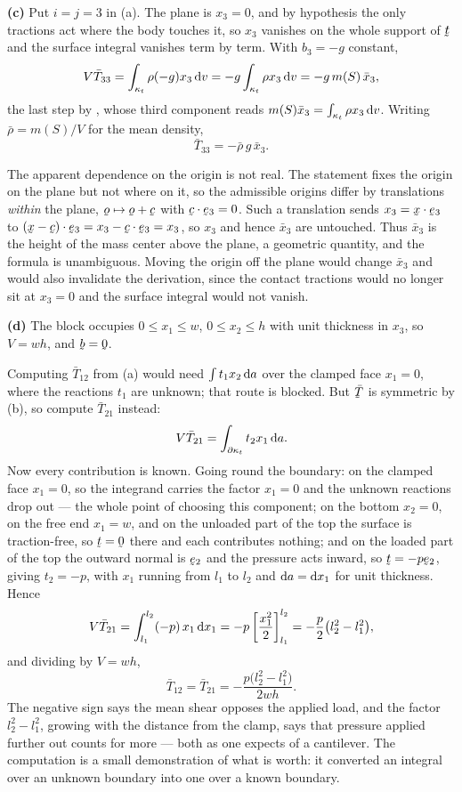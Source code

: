 \begin{solution}
\medskip
\noindent\textbf{(c)}
Put $i=j=3$ in (a). The plane is $x_{3}=0$, and by hypothesis the only
tractions act where the body touches it, so $x_{3}$ vanishes on the
whole support of $\bt$ and the surface integral vanishes term by term.
With $b_{3}=-g$ constant,
\[
   V\bar T_{33}=\int_{\kappa_{t}}\rho(-g)x_{3}\,\mathrm{d} v
   =-g\int_{\kappa_{t}}\rho x_{3}\,\mathrm{d} v
   =-g\,m(S)\,\bar x_{3} ,
\]
the last step by , whose third component reads
$m(S)\bar x_{3}=\int_{\kappa_{t}}\rho x_{3}\,\mathrm{d} v$. Writing
$\bar\rho=m(S)/V$ for the mean density,
\[
   \boxed{\;\bar T_{33}=-\bar\rho\,g\,\bar x_{3} .\;}
\]

The apparent dependence on the origin is not real. The statement fixes
the origin on the plane but not where on it, so the admissible origins
differ by translations \emph{within} the plane, $\bo\mapsto\bo+\bc$
with $\ip\bc{\be_{3}}=0$. Such a translation sends
$x_{3}=\ip\bx{\be_{3}}$ to $\ip{(\bx-\bc)}{\be_{3}}
=x_{3}-\ip\bc{\be_{3}}=x_{3}$, so $x_{3}$ and hence $\bar x_{3}$ are
untouched. Thus $\bar x_{3}$ is the height of the mass center above the
plane, a geometric quantity, and the formula is unambiguous. Moving the
origin off the plane would change $\bar x_{3}$ and would also
invalidate the derivation, since the contact tractions would no longer
sit at $x_{3}=0$ and the surface integral would not vanish.

\medskip
\noindent\textbf{(d)}
The block occupies $0\le x_{1}\le w$, $0\le x_{2}\le h$ with unit
thickness in $x_{3}$, so $V=wh$, and $\bb=\bze$.

Computing $\bar T_{12}$ from (a) would need $\int t_{1}x_{2}\,\mathrm{d} a$
over the clamped face $x_{1}=0$, where the reactions $t_{1}$ are
unknown; that route is blocked. But $\bar\bT$ is symmetric by (b), so
compute $\bar T_{21}$ instead:
\[
   V\bar T_{21}=\int_{\partial\kappa_{t}}t_{2}x_{1}\,\mathrm{d} a .
\]
Now every contribution is known. Going round the boundary:
on the clamped face $x_{1}=0$, so the integrand carries the factor
$x_{1}=0$ and the unknown reactions drop out --- the whole point of
choosing this component; on the bottom $x_{2}=0$, on the free end
$x_{1}=w$, and on the unloaded part of the top the surface is
traction-free, so $\bt=\bze$ there and each contributes nothing; and on
the loaded part of the top the outward normal is $\be_{2}$ and the
pressure acts inward, so $\bt=-p\be_{2}$, giving $t_{2}=-p$, with
$x_{1}$ running from $l_{1}$ to $l_{2}$ and $\mathrm{d} a=\mathrm{d} x_{1}$ for unit
thickness. Hence
\[
   V\bar T_{21}=\int_{l_{1}}^{l_{2}}(-p)\,x_{1}\,\mathrm{d} x_{1}
   =-p\left[\frac{x_{1}^{2}}{2}\right]_{l_{1}}^{l_{2}}
   =-\frac{p}{2}\big(l_{2}^{2}-l_{1}^{2}\big) ,
\]
and dividing by $V=wh$,
\[
   \boxed{\;\bar T_{12}=\bar T_{21}
   =-\frac{p\big(l_{2}^{2}-l_{1}^{2}\big)}{2wh} .\;}
\]
The negative sign says the mean shear opposes the applied load, and the
factor $l_{2}^{2}-l_{1}^{2}$, growing with the distance from the clamp,
says that pressure applied further out counts for more --- both as one
expects of a cantilever. The computation is a small demonstration of
what  is worth: it converted an integral over an unknown
boundary into one over a known boundary.
\end{solution}

